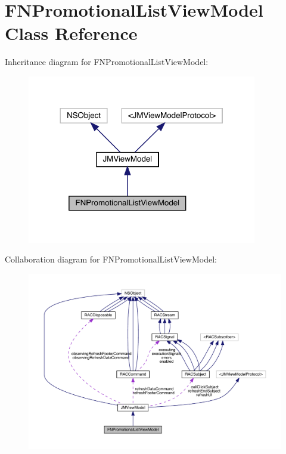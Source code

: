 \hypertarget{interface_f_n_promotional_list_view_model}{}\section{F\+N\+Promotional\+List\+View\+Model Class Reference}
\label{interface_f_n_promotional_list_view_model}


Inheritance diagram for F\+N\+Promotional\+List\+View\+Model\+:\nopagebreak
\begin{figure}[H]
\begin{center}
\leavevmode
\includegraphics[width=284pt]{interface_f_n_promotional_list_view_model__inherit__graph}
\end{center}
\end{figure}


Collaboration diagram for F\+N\+Promotional\+List\+View\+Model\+:\nopagebreak
\begin{figure}[H]
\begin{center}
\leavevmode
\includegraphics[width=350pt]{interface_f_n_promotional_list_view_model__coll__graph}
\end{center}
\end{figure}
